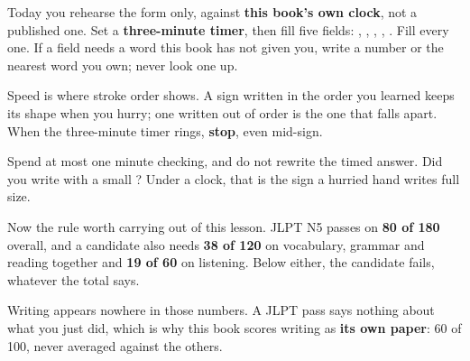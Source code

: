 Today you rehearse the form only, against \textbf{this book's own clock}, not a published one. Set a \textbf{three-minute timer}, then fill five fields: \textbf{}, \textbf{}, \textbf{}, \textbf{}, \textbf{}. Fill every one. If a field needs a word this book has not given you, write a number or the nearest word you own; never look one up.

Speed is where stroke order shows. A sign written in the order you learned keeps its shape when you hurry; one written out of order is the one that falls apart. When the three-minute timer rings, \textbf{stop}, even mid-sign.

\begin{tcolorbox}[breakable,colback=teal!4,colframe=teal!35!black,title={Before you move on}]
Spend at most one minute checking, and do not rewrite the timed answer. Did you write \textbf{} with a small \textbf{}? Under a clock, that is the sign a hurried hand writes full size.

Now the rule worth carrying out of this lesson. JLPT N5 passes on \textbf{80 of 180} overall, and a candidate also needs \textbf{38 of 120} on vocabulary, grammar and reading together and \textbf{19 of 60} on listening. Below either, the candidate fails, whatever the total says.

Writing appears nowhere in those numbers. A JLPT pass says nothing about what you just did, which is why this book scores writing as \textbf{its own paper}: 60 of 100, never averaged against the others.
\end{tcolorbox}
